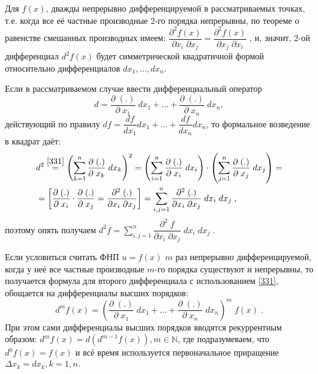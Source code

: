Для $ f(x) $, дважды непрерывно дифференцируемой в рассматриваемых точках, т.е. когда все её частные производные 2-го порядка непрерывны, по теореме о равенстве смешанных производных имеем:
$ \dfrac{\partial^2 f(x)}{\partial x_i \; \partial x_j} = 
  \dfrac{\partial^2 f(x)}{\partial x_j \; \partial x_i} $
  , и, значит, 2-ой дифференциал $ d^2 f(x) $ будет симметрической квадратичной формой относительно дифференциалов $ dx_1, \ldots, dx_n $.
  
Если в рассматриваемом случае  ввести дифференциальный оператор 
\begin{equation}
      \label{331}
      d = \dfrac{\partial \; (.)}{\partial \; x_1} \; d x_1 + 
      \ldots + \dfrac{\partial \; (.)}{\partial \; x_n} \; d x_n,
\end{equation}
действующий по правилу  $ df = \dfrac{df}{dx_1} dx_1  + \ldots + \dfrac{df}{dx_n} dx_n$,
то формальное возведение в квадрат даёт:
\begin{align*}
    &
    d^2 \overset{\eqref{331}}{=}
    \left( \sum_{k = 1}^{n} \dfrac{\partial \; (.)}{\partial \; x_k} \; d x_k \right)^2 = 
    \left( \sum_{i = 1}^{n} \dfrac{\partial \; (.)}{\partial \; x_i} \; d x_i \right) \cdot
    \left( \sum_{j = 1}^{n} \dfrac{\partial \; (.)}{\partial \; x_j} \; d x_j \right) =
    \\ & =
    \left[ \dfrac{\partial \; (.)}{\partial \; x_i} \cdot \dfrac{\partial \; (.)}{\partial \; x_j} = \dfrac{\partial^2 \; (.)}{\partial x_i \; \partial x_j}\right] =
    \sum_{i,j=1}^{n} \dfrac{\partial^2 \; (.)}{\partial x_i \; \partial x_j} \; d x_i \; d x_j
    \; ,
\end{align*}
поэтому опять получаем $ d^2 f =  \sum_{i,j=1}^{n} \dfrac{\partial^2 \;f}{\partial x_i \; \partial x_j} \; d x_i \; d x_j  \;$.

Если условиться считать ФНП $ u = f(x) $ $ m $ раз непрерывно дифференцируемой, когда у неё все частные производные $ m $-го порядка существуют и непрерывны, 
то получается формула для второго дифференциала с использованием \eqref{331}, обощается на дифференциалы высших порядков:
\begin{equation}
    \label{332}
    d^m f(x) =
    \left( \dfrac{\partial \; (.)}{\partial \; x_1} \; d x_1 + 
    \ldots + \dfrac{\partial \; (.)}{\partial \; x_n} \; d x_n \right)^m \;f(x)
    \; .
\end{equation}
При этом сами дифференциалы высших порядков вводятся рекуррентным образом: 
$ d^m f(x) = d(d ^{m-1}f(x)), m \in \mathbb{N} $, где подразумеваем, что $ d^0 f(x) = f(x) $ и
всё время используется первоначальное приращение $ \Delta x_k = d x_k, k = \overline{1, n}. $


